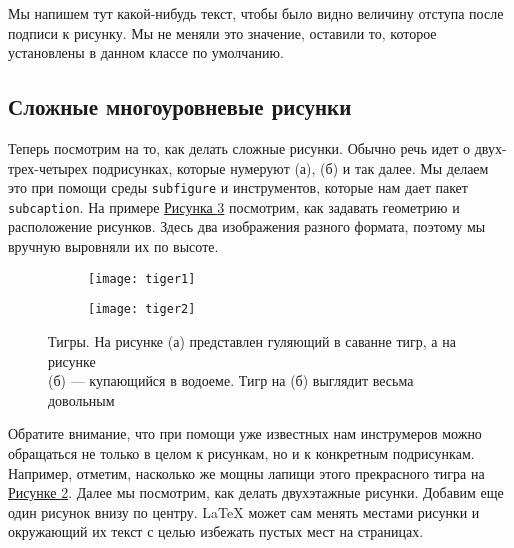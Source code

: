 Мы напишем тут какой-нибудь текст, чтобы было видно величину отступа после подписи к рисунку. Мы не меняли это значение, оставили то, которое установлены в данном классе по умолчанию.

\subsection{Сложные многоуровневые рисунки}
\label{subsec:comp-fig}

Теперь посмотрим на то, как делать сложные рисунки. Обычно речь идет о двух-трех-четырех подрисунках, которые нумеруют (а), (б) и так далее. Мы делаем это при помощи среды \verb|subfigure| и инструментов, которые нам дает пакет \verb|subcaption|. На примере \hyperref[fig:tiger]{Рисунка \ref*{fig:tiger}} посмотрим, как задавать геометрию и расположение рисунков. Здесь два изображения разного формата, поэтому мы вручную выровняли их по высоте.

\begin{figure}[ht]
	\centering
\hspace*{\fill}%
	\begin{subfigure}[b]{0.49\textwidth}
        \centering
		\texttt{[image: tiger1]}
		\caption{}
		\label{fig:tiger1}
	\end{subfigure}
\hfill
	\begin{subfigure}[b]{0.49\textwidth}
        \centering
		\texttt{[image: tiger2]}
        \caption{}
		\label{fig:tiger2}
	\end{subfigure}
\hspace*{\fill}%
	\caption{Тигры. На рисунке (а) представлен гуляющий в саванне тигр, а на рисунке \\ (б) --- купающийся в водоеме. Тигр на (б) выглядит весьма довольным}
	\label{fig:tiger}
\end{figure}

Обратите внимание, что при помощи уже известных нам инструмеров можно обращаться не только в целом к рисункам, но и к конкретным подрисункам. Например, отметим, насколько же мощны лапищи этого прекрасного тигра на \hyperref[fig:tiger2]{Рисунке \ref*{fig:tiger2}}. Далее мы посмотрим, как делать двухэтажные рисунки. Добавим еще один рисунок внизу по центру. \LaTeX{} может сам менять местами рисунки и окружающий их текст с целью избежать пустых мест на страницах.

